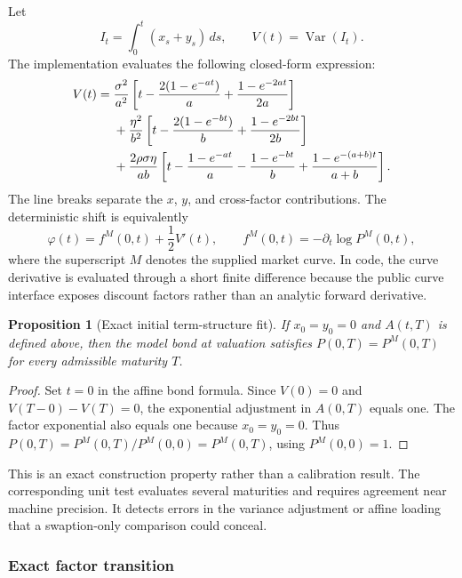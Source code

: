 \documentclass[11pt]{article}
\numberwithin{equation}{section}
\newtheorem{proposition}{Proposition}[section]
\theoremstyle{definition}
\theoremstyle{remark}
\begin{document}
Let
\[
  I_t=\int_0^t(x_s+y_s)\,ds,\qquad V(t)=\operatorname{Var}(I_t).
\]
The implementation evaluates the following closed-form expression:
\begin{align}
V(t)={}&\frac{\sigma^2}{a^2}
\left[t-\frac{2(1-e^{-at})}{a}+\frac{1-e^{-2at}}{2a}\right]\notag\\
&+\frac{\eta^2}{b^2}
\left[t-\frac{2(1-e^{-bt})}{b}+\frac{1-e^{-2bt}}{2b}\right]\notag\\
&+\frac{2\rho\sigma\eta}{ab}
\left[t-\frac{1-e^{-at}}{a}-\frac{1-e^{-bt}}{b}
+\frac{1-e^{-(a+b)t}}{a+b}\right].
\label{eq:integrated-variance}
\end{align}
The line breaks separate the $x$, $y$, and cross-factor contributions. The
deterministic shift is equivalently
\begin{equation}
  \varphi(t)=f^{M}(0,t)+\frac12 V'(t),\qquad
  f^{M}(0,t)=-\partial_t\log P^{M}(0,t),
\end{equation}
where the superscript $M$ denotes the supplied market curve. In code, the curve
derivative is evaluated through a short finite difference because the public
curve interface exposes discount factors rather than an analytic forward
derivative.

\begin{proposition}[Exact initial term-structure fit]
\label{prop:initial-fit}
If $x_0=y_0=0$ and $A(t,T)$ is defined above, then the model bond at valuation
satisfies $P(0,T)=P^{M}(0,T)$ for every admissible maturity $T$.
\end{proposition}
\begin{proof}
Set $t=0$ in the affine bond formula. Since $V(0)=0$ and
$V(T-0)-V(T)=0$, the exponential adjustment in $A(0,T)$ equals one.
The factor exponential also equals one because $x_0=y_0=0$. Thus
$P(0,T)=P^{M}(0,T)/P^{M}(0,0)=P^{M}(0,T)$, using $P^{M}(0,0)=1$.
\end{proof}

This is an exact construction property rather than a calibration result. The
corresponding unit test evaluates several maturities and requires agreement near
machine precision. It detects errors in the variance adjustment or affine
loading that a swaption-only comparison could conceal.

\subsubsection{Exact factor transition}
\end{document}
